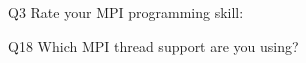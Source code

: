 \begin{description}%
\item{Q3} Rate your MPI programming skill:%
\item{Q18} Which MPI thread support are you using?%
\end{description}%
